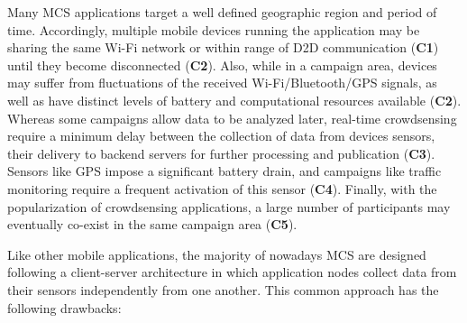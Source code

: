 Many MCS applications target a well defined geographic region and period of time. Accordingly, multiple mobile devices running the application may be sharing the same Wi-Fi network or within range of D2D communication (\textbf{C1}) until they become disconnected (\textbf{C2}). Also, while in a campaign area, devices may suffer from fluctuations of the received Wi-Fi/Bluetooth/GPS signals, as well as have distinct levels of battery and computational resources available (\textbf{C2}).
Whereas some campaigns allow data to be analyzed later, real-time crowdsensing require a minimum delay between the collection of data from devices sensors, their delivery to backend servers for further processing and publication (\textbf{C3}). Sensors like GPS impose a significant battery drain, and campaigns like traffic monitoring require a frequent activation of this sensor (\textbf{C4}). Finally, with the popularization of crowdsensing applications, a large number of participants may eventually co-exist in the same campaign area (\textbf{C5}). 

Like other mobile applications, the majority of nowadays MCS are designed following a client-server architecture in which application nodes collect data from their sensors independently from one another. 
This common approach has the following drawbacks:


